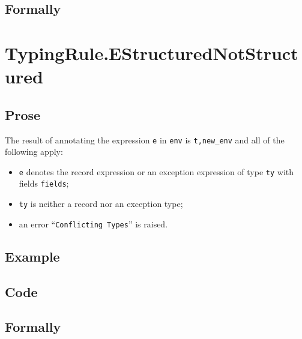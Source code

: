 \documentclass{book}
\begin{document}
\begin{emptyformal}
    \subsection{Formally}
\end{emptyformal}


\section{TypingRule.EStructuredNotStructured \label{sec:TypingRule.EStructuredNotStructured}}

  \subsection{Prose}
  The result of annotating the expression \texttt{e} in \texttt{env} is
\texttt{t,new\_env} and all of the following apply:
  \begin{itemize}
  \item \texttt{e} denotes the record expression or an exception expression of type \texttt{ty} with fields \texttt{fields};
  \item \texttt{ty} is neither a record nor an exception type;
  \item an error ``\texttt{Conflicting Types}'' is raised.
  \end{itemize}

  \subsection{Example}

  \subsection{Code}

\begin{emptyformal}
    \subsection{Formally}
\end{emptyformal}
\end{document}
